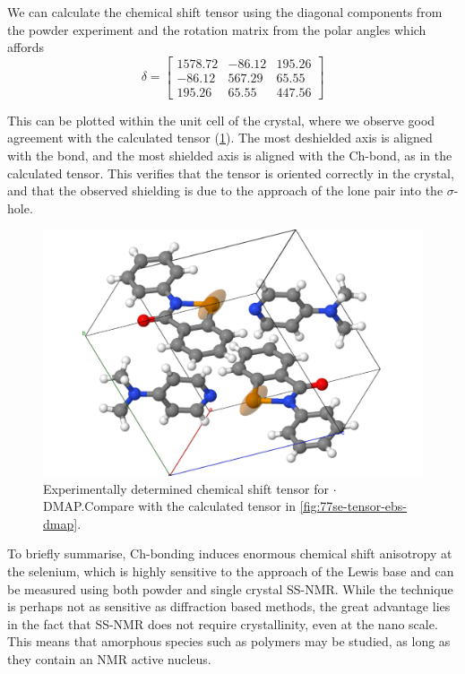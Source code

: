 \begin{refsection}
We can calculate the chemical shift tensor using the diagonal components from the powder experiment and the rotation matrix from the polar angles which affords
\begin{equation}
  \delta = \begin{bmatrix} 1578.72 & -86.12 & 195.26 \\ -86.12 & 567.29 & 65.55 \\ 195.26 & 65.55 & 447.56 \end{bmatrix}
\end{equation}

This can be plotted within the unit cell of the crystal, where we observe good agreement with the calculated tensor (\cref{fig:expt-tensor-ebs-dmap}).
The most deshielded axis is aligned with the  bond, and the most shielded axis is aligned with the Ch-bond, as in the calculated tensor.
This verifies that the tensor is oriented correctly in the crystal, and that the observed shielding is due to the approach of the lone pair into the $ \sigma $-hole.

\begin{figure}
  \centering
  \includegraphics[width=0.7\linewidth]{Figures/expt-tensor-ebs-dmap.pdf}
  \caption[Experimentally determined chemical shift tensor for $ \cdot $DMAP.]{Experimentally determined chemical shift tensor for $ \cdot $DMAP.\@ Compare with the calculated tensor in \cref{fig:77se-tensor-ebs-dmap}.}\label{fig:expt-tensor-ebs-dmap}
\end{figure}

To briefly summarise, Ch-bonding induces enormous chemical shift anisotropy at the selenium, which is highly sensitive to the approach of the Lewis base and can be measured using both powder and single crystal SS-NMR.\@
While the technique is perhaps not as sensitive as diffraction based methods, the great advantage lies in the fact that SS-NMR does not require crystallinity, even at the nano scale.
This means that amorphous species such as polymers may be studied, as long as they contain an NMR active nucleus.


\end{refsection}
